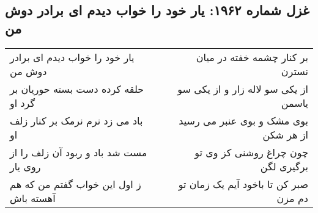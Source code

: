 \begin{center}
\section*{غزل شماره ۱۹۶۲: یار خود را خواب دیدم ای برادر دوش من}
\label{sec:1962}
\begin{longtable}{l p{0.5cm} r}
یار خود را خواب دیدم ای برادر دوش من
&&
بر کنار چشمه خفته در میان نسترن
\\
حلقه کرده دست بسته حوریان بر گرد او
&&
از یکی سو لاله زار و از یکی سو یاسمن
\\
باد می زد نرم نرمک بر کنار زلف او
&&
بوی مشک و بوی عنبر می رسید از هر شکن
\\
مست شد باد و ربود آن زلف را از روی یار
&&
چون چراغ روشنی کز وی تو برگیری لگن
\\
ز اول این خواب گفتم من که هم آهسته باش
&&
صبر کن تا باخود آیم یک زمان تو دم مزن
\\
\end{longtable}
\end{center}
